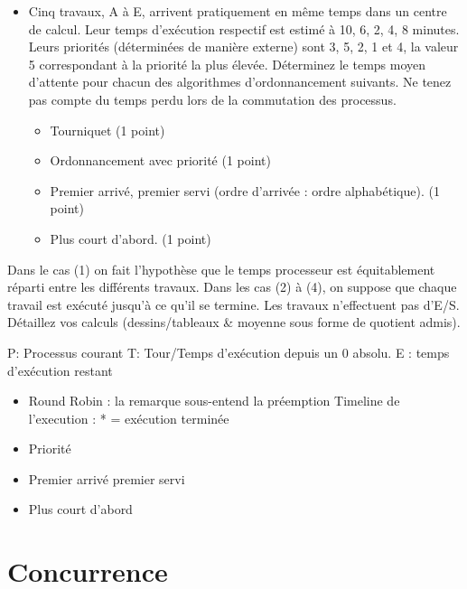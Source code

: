 \begin{itemize}
  \item Cinq travaux, A \`a E, arrivent pratiquement en même temps dans un centre de calcul. Leur temps d'ex\'ecution respectif est estim\'e \`a 10, 6, 2, 4, 8 minutes. Leurs priorit\'es (d\'etermin\'ees de mani\`ere externe) sont 3, 5, 2, 1 et 4, la valeur 5 correspondant \`a la priorit\'e la plus \'elev\'ee. D\'eterminez le temps moyen d'attente pour chacun des algorithmes d'ordonnancement suivants. Ne tenez pas compte du temps perdu lors de la commutation des processus.
  \begin{itemize}
    \item Tourniquet (1 point)
    \item Ordonnancement avec priorit\'e (1 point)
    \item Premier arriv\'e, premier servi (ordre d'arriv\'ee : ordre alphab\'etique). (1 point)
    \item Plus court d'abord. (1 point)
  \end{itemize}
\end{itemize}
Dans le cas (1) on fait l'hypoth\`ese que le temps processeur est \'equitablement r\'eparti entre les diff\'erents travaux. Dans les cas (2) \`a (4), on suppose que chaque travail est ex\'ecut\'e jusqu'\`a ce qu'il se termine. Les travaux n'effectuent pas d'E/S. D\'etaillez vos calculs (dessins/tableaux \& moyenne sous forme de quotient admis).

\begin{correction}

P: Processus courant
T: Tour/Temps d'ex\'ecution depuis un 0 absolu.
E : temps d'ex\'ecution restant
\begin{itemize}
  \item Round Robin : la remarque sous-entend la pr\'eemption
  \newline Timeline de l'execution : * = ex\'ecution termin\'ee
  \item Priorit\'e
  \item Premier arriv\'e premier servi
  \item Plus court d'abord
\end{itemize}

\end{correction}

\section{{Concurrence}
         {\hfill{} }}

